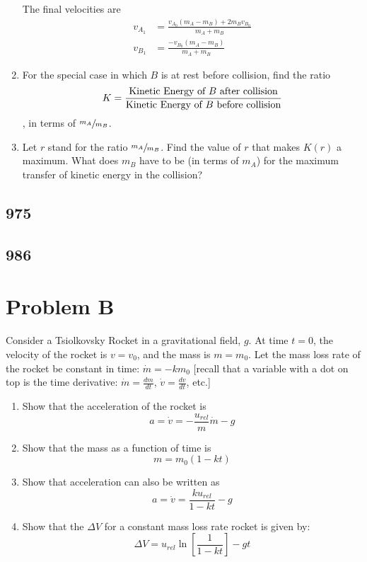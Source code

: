 \documentclass{article}
\begin{document}
\begin{enumerate}[label = \textbf{(\alph*)}]
\begin{mdframed}
			The final velocities are
			\begin{align*}
				v_{A_1} & = \frac{ v_{A_0}(m_A - m_B) + 2m_Bv_{B_0} }{ m_A + m_B } \\
				v_{B_1} & = \frac{ -v_{B_0}(m_A - m_B) }{ m_A + m_B }
			\end{align*}
		\end{mdframed}
	\item For the special case in which $ B $ is at rest before collision, find the ratio $$ K = \frac{ \text{Kinetic Energy of $ B $ after collision} }{ \text{Kinetic Energy of $ B $ before collision} } $$, in terms of $ \sfrac{m_A}{m_B} $.
	\item Let $ r $ stand for the ratio $ \sfrac{m_A}{m_B} $. Find the value of $ r $ that makes $ K(r) $ a maximum. What does $ m_B $ have to be (in terms of $ m_A $) for the maximum transfer of kinetic energy in the collision?
\end{enumerate}

\subsection{975}

\subsection{986}

\section{Problem B}

Consider a Tsiolkovsky Rocket in a gravitational field, $ g $. At time $ t = 0 $, the velocity of the rocket is $ v = v_0 $, and the mass is $ m = m_0 $. Let the mass loss rate of the rocket be constant in time: $ \dot{m} = -km_0 $ [recall that a variable with a dot on top is the time derivative: $ \dot{m} = \frac{dm}{dt} $, $ \dot{v} = \frac{dv}{dt} $, etc.]
\begin{enumerate}[label = \textbf{\arabic*.}]
	\item Show that the acceleration of the rocket is
		\begin{equation*}
			a = \dot{v} = -\frac{u_{rel}}{m}\dot{m} - g
		\end{equation*}
	\item Show that the mass as a function of time is
		\begin{equation*}
			m = m_0(1 - kt)
		\end{equation*}
	\item Show that acceleration can also be written as
		\begin{equation*}
			a = \dot{v} = \frac{ku_{rel}}{1 - kt} - g
		\end{equation*}
	\item Show that the $ \Delta V $ for a constant mass loss rate rocket is given by:
		\begin{equation*}
			\Delta V = u_{rel}\ln \left[ \frac{1}{1 - kt} \right] - gt
		\end{equation*}
\end{enumerate}
\end{document}
